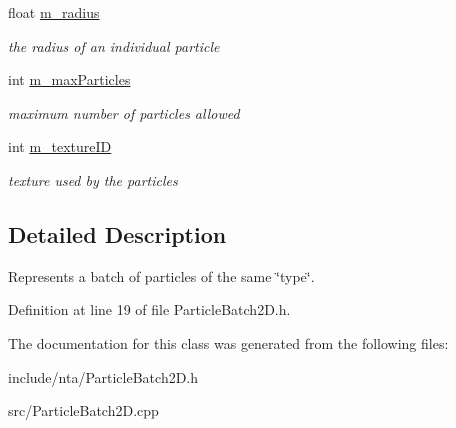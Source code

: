 \begin{DoxyCompactItemize}
float \hyperlink{classnta_1_1ParticleBatch2D_ac564b88da2f73d5692cbdec15478fe4d}{m\+\_\+radius}
\begin{DoxyCompactList}\small\item\em the radius of an individual particle \end{DoxyCompactList}\item 
\mbox{\label{classnta_1_1ParticleBatch2D_acf0dbc3bae31f962ed403daf06848948}} 
int \hyperlink{classnta_1_1ParticleBatch2D_acf0dbc3bae31f962ed403daf06848948}{m\+\_\+max\+Particles}
\begin{DoxyCompactList}\small\item\em maximum number of particles allowed \end{DoxyCompactList}\item 
\mbox{\label{classnta_1_1ParticleBatch2D_a73232a0481db52884b42c50deb456add}} 
int \hyperlink{classnta_1_1ParticleBatch2D_a73232a0481db52884b42c50deb456add}{m\+\_\+texture\+ID}
\begin{DoxyCompactList}\small\item\em texture used by the particles \end{DoxyCompactList}\end{DoxyCompactItemize}


\subsection{Detailed Description}
Represents a batch of particles of the same \char`\"{}type\char`\"{}. 

Definition at line 19 of file Particle\+Batch2\+D.\+h.



The documentation for this class was generated from the following files\+:\begin{DoxyCompactItemize}
\item 
include/nta/Particle\+Batch2\+D.\+h\item 
src/Particle\+Batch2\+D.\+cpp\end{DoxyCompactItemize}
